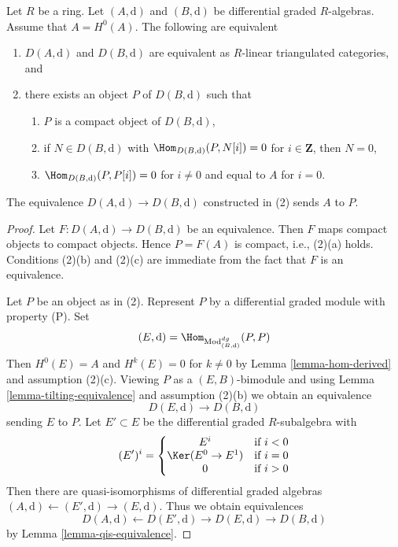 \begin{lemma}
\label{lemma-rickard}
Let $R$ be a ring. Let $(A, \text{d})$ and $(B, \text{d})$ be
differential graded $R$-algebras. Assume that $A = H^0(A)$.
The following are equivalent
\begin{enumerate}
\item $D(A, \text{d})$ and $D(B, \text{d})$ are equivalent as $R$-linear
triangulated categories, and
\item there exists an object $P$ of $D(B, \text{d})$ such that
\begin{enumerate}
\item $P$ is a compact object of $D(B, \text{d})$,
\item if $N \in D(B, \text{d})$ with $\Hom_{D(B, \text{d})}(P, N[i]) = 0$
for $i \in \mathbf{Z}$, then $N = 0$,
\item $\Hom_{D(B, \text{d})}(P, P[i]) = 0$ for $i \not = 0$ and
equal to $A$ for $i = 0$.
\end{enumerate}
\end{enumerate}
The equivalence $D(A, \text{d}) \to D(B, \text{d})$
constructed in (2) sends $A$ to $P$.
\end{lemma}

\begin{proof}
Let $F : D(A, \text{d}) \to D(B, \text{d})$ be an equivalence.
Then $F$ maps compact objects to compact objects. Hence $P = F(A)$ is
compact, i.e., (2)(a) holds. Conditions (2)(b) and (2)(c) are immediate
from the fact that $F$ is an equivalence.

\medskip\noindent
Let $P$ be an object as in (2). Represent $P$ by a
differential graded module with property (P). Set
$$
(E, \text{d}) = \Hom_{\text{Mod}^{dg}_{(B, \text{d})}}(P, P)
$$
Then $H^0(E) = A$ and $H^k(E) = 0$ for $k \not = 0$ by
Lemma \ref{lemma-hom-derived} and assumption (2)(c).
Viewing $P$ as a $(E, B)$-bimodule and using
Lemma \ref{lemma-tilting-equivalence} and assumption (2)(b)
we obtain an equivalence
$$
D(E, \text{d}) \to D(B, \text{d})
$$
sending $E$ to $P$.
Let $E' \subset E$ be the differential graded $R$-subalgebra
with
$$
(E')^i = \left\{
\begin{matrix}
E^i & \text{if }i < 0 \\
\Ker(E^0 \to E^1) & \text{if }i = 0 \\
0 & \text{if }i > 0
\end{matrix}
\right.
$$
Then there are quasi-isomorphisms of differential graded
algebras $(A, \text{d}) \leftarrow (E', \text{d}) \rightarrow (E, \text{d})$.
Thus we obtain equivalences
$$
D(A, \text{d}) \leftarrow D(E', \text{d}) \rightarrow D(E, \text{d})
\rightarrow D(B, \text{d})
$$
by Lemma \ref{lemma-qis-equivalence}.
\end{proof}